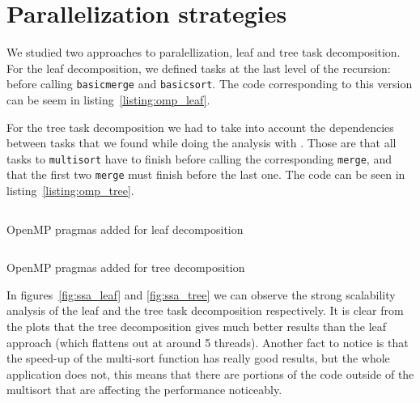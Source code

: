 \section{Parallelization strategies}%
\label{sec:par_strats}

We studied two approaches to paralellization, leaf and tree task decomposition. For the leaf decomposition, we
defined tasks at the last level of the recursion: before calling \texttt{basicmerge} and \texttt{basicsort}. The
code corresponding to this version can be seem in listing~\ref{listing:omp_leaf}. 

For the tree task decomposition
we had to take into account the dependencies between tasks that we found while doing the analysis with . Those are that all tasks to \texttt{multisort} have to finish before calling the corresponding
\texttt{merge}, and that the first two \texttt{merge} must finish before the last one. The code can be seen in
listing~\ref{listing:omp_tree}.

\begin{listing}[H]
\inputminted[firstline=32,lastline=63]{c}{sources/multisort-omp-leaf.c}
\caption{OpenMP pragmas added for leaf decomposition}
\label{listing:omp_leaf}
\end{listing}

\begin{listing}[H]
\inputminted[firstline=32,lastline=74]{c}{sources/multisort-omp-tree.c}
\caption{OpenMP pragmas added for tree decomposition}
\label{listing:omp_tree}
\end{listing}

In figures~\ref{fig:ssa_leaf} and \ref{fig:ssa_tree} we can observe the strong scalability analysis
of the leaf and the tree task decomposition respectively. It is clear from the plots that the
tree decomposition gives much better results than the leaf approach (which flattens out at around 5 threads).
Another fact to notice is that the speed-up of the multi-sort function has really good results, but the
whole application does not, this means that there are portions of the code outside of the multisort that are
affecting the performance noticeably.


